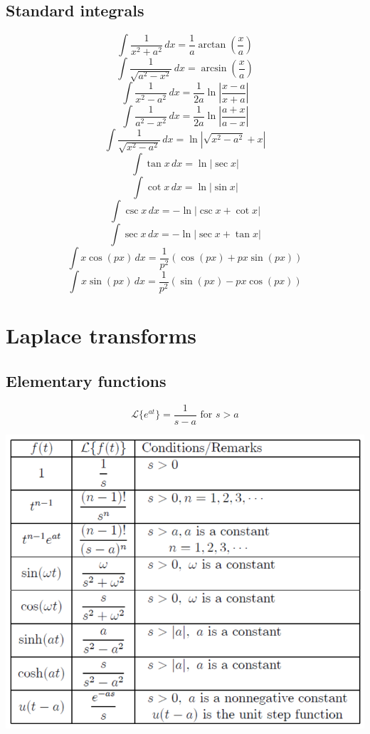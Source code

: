 \documentclass[11pt]{article}
\begin{document}
\subsection{Standard integrals}
\label{sec:org4288b70}
\[\int \frac{1}{x^2 + a^2} \, dx = \frac{1}{a} \arctan \left(\frac{x}{a} \right)\]
\[\int \frac{1}{\sqrt{a^2 - x^2}} \, dx = \arcsin \left(\frac{x}{a} \right)\]
\[\int \frac{1}{x^2 - a^2} \, dx = \frac{1}{2a} \ln \left|\frac{x - a}{x + a} \right|\]
\[\int \frac{1}{a^2 - x^2} \, dx = \frac{1}{2a} \ln \left|\frac{a + x}{a - x} \right|\]
\[\int \frac{1}{\sqrt{x^2 - a^2}} \, dx = \ln \left|\sqrt{x^2 - a^2} + x \right|\]
\[\int \tan x \, dx = \ln |\sec x|\]
\[\int \cot x \, dx = \ln |\sin x|\]
\[\int \csc x \, dx = - \ln |\csc x + \cot x|\]
\[\int \sec x \, dx = - \ln |\sec x + \tan x|\]
\[\int x \cos (px) \, dx = \frac{1}{p^2} (\cos (px) + px \sin (px))\]
\[\int x \sin (px) \, dx = \frac{1}{p^2} (\sin (px) - px \cos (px))\]

 \newpage
\section{Laplace transforms}
\label{sec:org64dc58a}

\subsection{Elementary functions}
\label{sec:org68ba004}
\[\mathcal{L} \{ e^{at} \} = \frac{1}{s - a} \text{ for } s > a\]
\begin{center}
\includegraphics[width=.9\linewidth]{./images/laplace-transform-of-elementary-functions.png}
\end{center}
\end{document}

